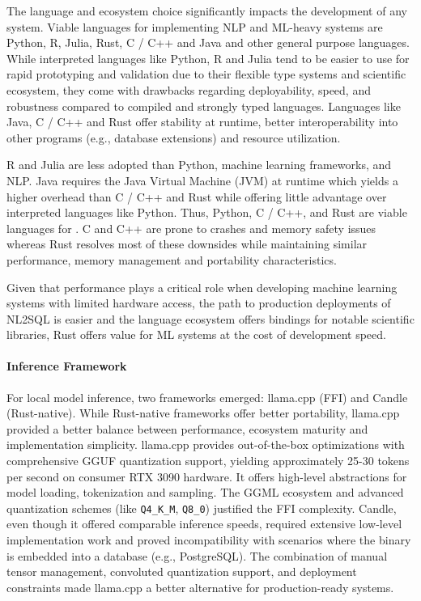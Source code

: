 The language and ecosystem choice significantly impacts the development of any
system. Viable languages for implementing NLP and ML-heavy systems are Python,
R, Julia, Rust, C / C++ and Java and other general purpose languages. While
interpreted languages like Python, R and Julia tend to be easier to use for
rapid prototyping and validation due to their flexible type systems and
scientific ecosystem, they come with drawbacks regarding deployability, speed,
and robustness compared to compiled and strongly typed languages. Languages
like Java, C / C++ and Rust offer stability at runtime, better interoperability
into other programs (e.g., database extensions) and resource utilization.

R and Julia are less adopted than Python, machine learning frameworks, and NLP.
Java requires the Java Virtual Machine (JVM) at runtime which yields a higher
overhead than C / C++ and Rust while offering little advantage over interpreted
languages like Python. Thus, Python, C / C++, and Rust are viable languages for
\Natural. C and C++ are prone to crashes and memory safety issues
whereas Rust resolves most of these downsides while maintaining similar
performance, memory management and portability characteristics.

Given that performance plays a critical role when developing machine learning
systems with limited hardware access, the path to production
deployments of NL2SQL is easier and the language ecosystem offers bindings
for notable scientific libraries, Rust offers value
for ML systems at the cost of development speed.

\paragraph{Inference Framework}

For local model inference, two frameworks emerged: llama.cpp (FFI) and Candle
(Rust-native). While Rust-native frameworks offer better portability, llama.cpp
provided a better balance between performance, ecosystem maturity and
implementation simplicity. llama.cpp provides out-of-the-box optimizations with
comprehensive GGUF quantization support, yielding approximately 25-30 tokens
per second on consumer RTX 3090 hardware. It offers high-level abstractions for
model loading, tokenization and sampling. The GGML ecosystem and advanced
quantization schemes (like \texttt{Q4\_K\_M}, \texttt{Q8\_0}) justified the FFI
complexity. Candle, even though it offered comparable inference speeds,
required extensive low-level implementation work and proved incompatibility
with scenarios where the binary is embedded into a database (e.g., PostgreSQL).
The combination of manual tensor management, convoluted quantization support,
and deployment constraints made llama.cpp a better alternative for
production-ready systems.

